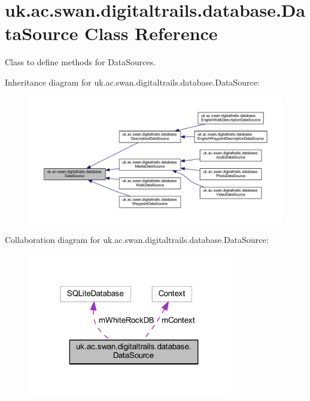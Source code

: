 \hypertarget{classuk_1_1ac_1_1swan_1_1digitaltrails_1_1database_1_1_data_source}{\section{uk.\+ac.\+swan.\+digitaltrails.\+database.\+Data\+Source Class Reference}
\label{classuk_1_1ac_1_1swan_1_1digitaltrails_1_1database_1_1_data_source}
}


Class to define methods for Data\+Sources.  




Inheritance diagram for uk.\+ac.\+swan.\+digitaltrails.\+database.\+Data\+Source\+:\nopagebreak
\begin{figure}[H]
\begin{center}
\leavevmode
\includegraphics[width=350pt]{classuk_1_1ac_1_1swan_1_1digitaltrails_1_1database_1_1_data_source__inherit__graph}
\end{center}
\end{figure}


Collaboration diagram for uk.\+ac.\+swan.\+digitaltrails.\+database.\+Data\+Source\+:\nopagebreak
\begin{figure}[H]
\begin{center}
\leavevmode
\includegraphics[width=253pt]{classuk_1_1ac_1_1swan_1_1digitaltrails_1_1database_1_1_data_source__coll__graph}
\end{center}
\end{figure}
